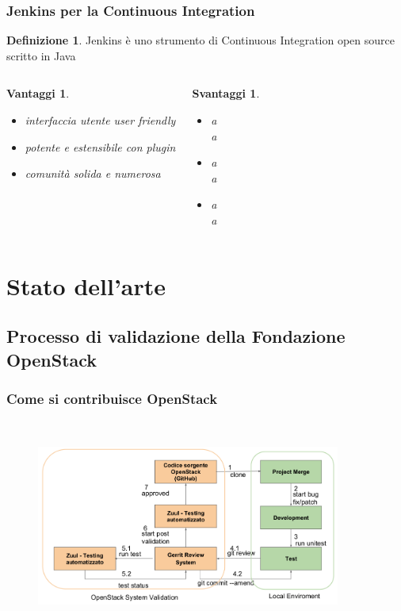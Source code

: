 \documentclass{beamer}
\theoremstyle{definition}
\newtheorem{definizione}{Definizione}
\theoremstyle{plain}
\newtheorem{vantaggi}{Vantaggi}
\newtheorem{svantaggi}{Svantaggi}
\begin{document}
\begin{frame}
\frametitle{Jenkins per la Continuous Integration}
\begin{definizione}
\alert{Jenkins} è uno strumento di Continuous Integration open source scritto in Java
\end{definizione}
\begin{columns}
\begin{vantaggi}
\begin{itemize}
\item
interfaccia utente user friendly
\item
potente e estensibile con plugin
\item
comunità solida e numerosa
\end{itemize}
\end{vantaggi}
\begin{svantaggi}
\begin{itemize}
\item
a\\
a
\item
a\\
a
\item
a\\
a
\end{itemize}
\end{svantaggi}
\end{columns}
\end{frame}

\section{Stato dell'arte}
\subsection{Processo di validazione della Fondazione OpenStack}
\begin{frame}
\frametitle{Come si contribuisce OpenStack}
\begin{figure}[!h]
	\begin{center}
\includegraphics[width=10cm, height=7cm]{sviluppo.png}
\end{center}
\end{figure}
\end{frame}
\end{document}
